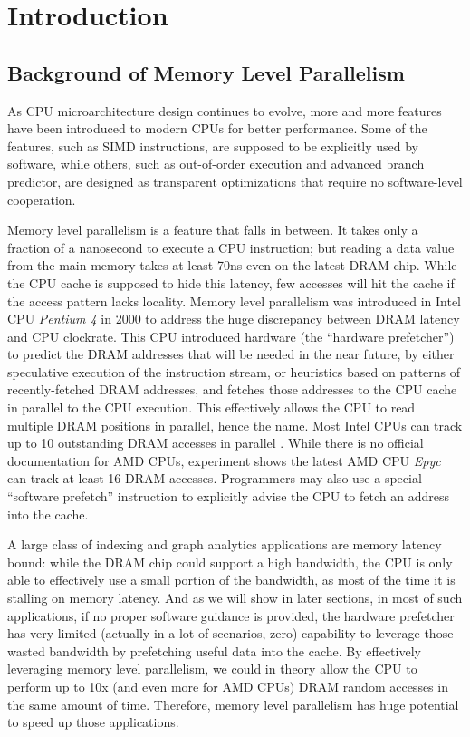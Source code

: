 \documentclass[11pt, usletter]{article}
\begin{document}
\newpage

\tableofcontents

\newpage

\section{Introduction} \label{introduction}

\subsection{Background of Memory Level Parallelism}

As CPU microarchitecture design continues to evolve, more and more features have been introduced 
to modern CPUs for better performance. Some of the features, such as SIMD instructions, 
are supposed to be explicitly used by software, while others, such as out-of-order execution 
and advanced branch predictor, are designed as transparent optimizations that require no 
software-level cooperation.

Memory level parallelism is a feature that falls in between. 
It takes only a fraction of a nanosecond to execute a CPU instruction; 
but reading a data value from the main memory takes at least 70ns even on the latest DRAM chip.
While the CPU cache is supposed to hide this latency, few accesses will hit the cache if the access pattern lacks locality.
Memory level parallelism was introduced in Intel CPU \textit{Pentium 4} in 2000 
to address the huge discrepancy between DRAM latency and CPU clockrate.
This CPU introduced hardware (the ``hardware prefetcher'') to predict the DRAM addresses that will be needed in the near future, 
by either speculative execution of the instruction stream, 
or heuristics based on patterns of recently-fetched DRAM addresses, 
and fetches those addresses to the CPU cache in parallel to the CPU execution.
This effectively allows the CPU to read multiple DRAM positions in parallel, hence the name.
Most Intel CPUs can track up to 10 outstanding DRAM accesses in parallel \cite{IntelOptGuide}.
While there is no official documentation for AMD CPUs, 
experiment shows the latest AMD CPU \textit{Epyc} can track at least 16 DRAM accesses. 
Programmers may also use a special ``software prefetch'' instruction to
explicitly advise the CPU to fetch an address into the cache.

A large class of indexing and graph analytics applications are memory latency bound: 
while the DRAM chip could support a high bandwidth, 
the CPU is only able to effectively use a small portion of the bandwidth, 
as most of the time it is stalling on memory latency.
And as we will show in later sections, 
in most of such applications, if no proper software guidance is provided, 
the hardware prefetcher has very limited (actually in a lot of scenarios, zero)
capability to leverage those wasted bandwidth by prefetching useful data into the cache. 
By effectively leveraging memory level parallelism, 
we could in theory allow the CPU to perform up to 10x (and even more for AMD CPUs) DRAM random accesses 
in the same amount of time. Therefore, memory level parallelism has huge potential to speed up those applications.
\end{document}
